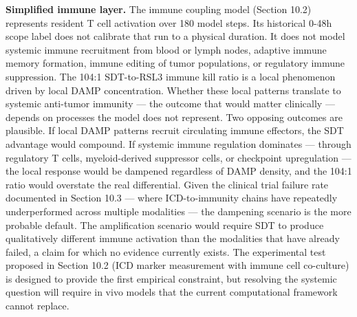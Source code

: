 \documentclass[11pt,twoside,openright]{report}
\begin{document}
\textbf{Simplified immune layer.} The immune coupling model (Section 10.2) represents resident T cell activation over 180 model steps. Its historical 0-48h scope label does not calibrate that run to a physical duration. It does not model systemic immune recruitment from blood or lymph nodes, adaptive immune memory formation, immune editing of tumor populations, or regulatory immune suppression. The 104:1 SDT-to-RSL3 immune kill ratio is a local phenomenon driven by local DAMP concentration. Whether these local patterns translate to systemic anti-tumor immunity --- the outcome that would matter clinically --- depends on processes the model does not represent. Two opposing outcomes are plausible. If local DAMP patterns recruit circulating immune effectors, the SDT advantage would compound. If systemic immune regulation dominates --- through regulatory T cells, myeloid-derived suppressor cells, or checkpoint upregulation --- the local response would be dampened regardless of DAMP density, and the 104:1 ratio would overstate the real differential. Given the clinical trial failure rate documented in Section 10.3 --- where ICD-to-immunity chains have repeatedly underperformed across multiple modalities --- the dampening scenario is the more probable default. The amplification scenario would require SDT to produce qualitatively different immune activation than the modalities that have already failed, a claim for which no evidence currently exists. The experimental test proposed in Section 10.2 (ICD marker measurement with immune cell co-culture) is designed to provide the first empirical constraint, but resolving the systemic question will require in vivo models that the current computational framework cannot replace.
\end{document}
